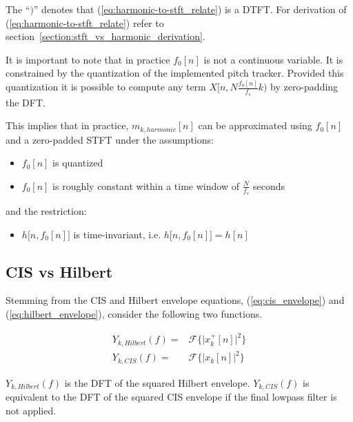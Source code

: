 \documentclass [11pt, proquest,oneside] {ganter_thesis}[2015/03/03]
\begin{document}
The ``$)$'' denotes that (\ref{eq:harmonic-to-stft_relate}) is a DTFT.  For derivation of (\ref{eq:harmonic-to-stft_relate}) refer to section~\ref{section:stft_vs_harmonic_derivation}.

It is important to note that in practice $f_0[n]$ is not a continuous variable.  It is constrained by the quantization of the implemented pitch tracker.  Provided this quantization it is possible to compute any term $X[n, N\frac{f_0[n]}{f_s}k)$ by zero-padding the DFT.

This implies that in practice, $m_{k,harmonic}[n]$ can be approximated using $f_0[n]$ and a zero-padded STFT under the assumptions:

\begin{itemize}
\setlength\itemsep{-1em}
	\item $f_0[n]$ is quantized
	\item $f_0[n]$ is roughly constant within a time window of $\frac{N}{f_s}$ seconds
\end{itemize}

and the restriction:

\begin{itemize}
\setlength\itemsep{-1em}
	\item $h\Big[n, f_0[n] \Big]$ is time-invariant, i.e. $h\Big[n, f_0[n] \Big] = h[n]$
\end{itemize}

\subsection{CIS vs Hilbert}

Stemming from the CIS and Hilbert envelope equations, (\ref{eq:cis_envelope}) and (\ref{eq:hilbert_envelope}), consider the following two functions.

\begin{align}
\label{eq:hilbert_squared}
Y_{k,Hilbert}(f) =& \mathcal{F}\Big\{ \Big| x^+_k[n] \Big|^2  \Big\} \\
\label{eq:cis_squared_prefilter}
Y_{k,CIS}(f) =& \mathcal{F}\Big\{ \Big| x_k[n] \Big|^2  \Big\}
\end{align}

$Y_{k,Hilbert}(f)$ is the DFT of the squared Hilbert envelope.  $Y_{k,CIS}(f)$ is equivalent to the DFT of the squared CIS envelope if the final lowpass filter is not applied.
\end{document}
